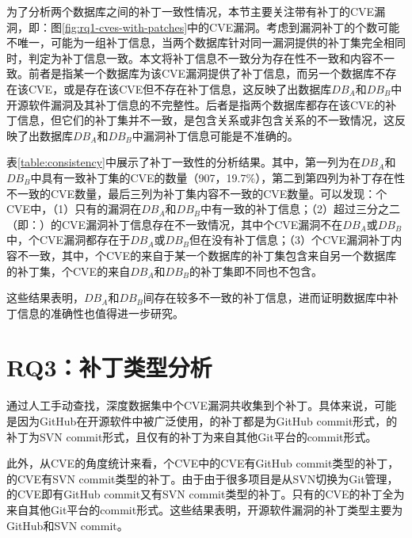 为了分析两个数据库之间的补丁一致性情况，本节主要关注带有补丁的CVE漏洞，即：图\ref{fig:rq1-cves-with-patches}中的CVE漏洞。考虑到漏洞补丁的个数可能不唯一，可能为一组补丁信息，当两个数据库针对同一漏洞提供的补丁集完全相同时，判定为补丁信息一致。本文将补丁信息不一致分为存在性不一致和内容不一致。前者是指某一个数据库为该CVE漏洞提供了补丁信息，而另一个数据库不存在该CVE，或是存在该CVE但不存在补丁信息，这反映了出数据库$DB_A$和$DB_B$中开源软件漏洞及其补丁信息的不完整性。后者是指两个数据库都存在该CVE的补丁信息，但它们的补丁集并不一致，是包含关系或非包含关系的不一致情况，这反映了出数据库$DB_A$和$DB_B$中漏洞补丁信息可能是不准确的。


表\ref{table:consistency}中展示了补丁一致性的分析结果。其中，第一列为在$DB_A$和$DB_B$中具有一致补丁集的CVE的数量（907，19.7\%），第二到第四列为补丁存在性不一致的CVE数量，最后三列为补丁集内容不一致的CVE数量。可以发现：个CVE中，（1）只有的漏洞在$DB_A$和$DB_B$中有一致的补丁信息；（2）超过三分之二（即：）的CVE漏洞补丁信息存在不一致情况，其中个CVE漏洞不在$DB_{A}$或$DB_{B}$中，个CVE漏洞都存在于$DB_{A}$或$DB_{B}$但在没有补丁信息；（3）个CVE漏洞补丁内容不一致，其中，个CVE的来自于某一个数据库的补丁集包含来自另一个数据库的补丁集，个CVE的来自$DB_{A}$和$DB_{B}$的补丁集即不同也不包含。

这些结果表明，$DB_A$和$DB_B$间存在较多不一致的补丁信息，进而证明数据库中补丁信息的准确性也值得进一步研究。


\section{RQ3：补丁类型分析}\label{sec:type}

通过人工手动查找，深度数据集中个CVE漏洞共收集到个补丁。具体来说，可能是因为GitHub在开源软件中被广泛使用，的补丁都是为GitHub commit形式，的补丁为SVN commit形式，且仅有的补丁为来自其他Git平台的commit形式。

此外，从CVE的角度统计来看，个CVE中的CVE有GitHub commit类型的补丁，的CVE有SVN commit类型的补丁。由于由于很多项目是从SVN切换为Git管理，的CVE即有GitHub commit又有SVN commit类型的补丁。只有的CVE的补丁全为来自其他Git平台的commit形式。这些结果表明，开源软件漏洞的补丁类型主要为GitHub和SVN commit。

